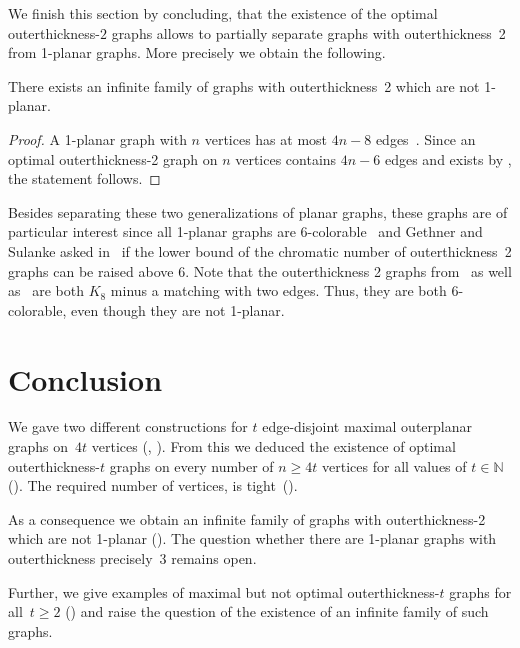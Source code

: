 \documentclass[unicode,runningheads,envcountsame,a4paper,dvipsnames,12pt]{llncs}
\newcommand{\N}{\mathbb{N}}
\begin{document}
	We finish this section by concluding, that the existence of the optimal outerthick\-ness-\(2\) graphs allows to partially separate graphs with outerthickness~2 from 1-planar graphs. More precisely we obtain the following.
	
	\begin{corollary}\label{cor:separating-outerthickness2-1planar}
		There exists an infinite family of graphs with outerthickness~2 which are not 1-planar.
	\end{corollary}
	
	\begin{proof}
		A 1-planar graph with \(n\) vertices has at most \(4n-8\) edges~\cite{edge-num-1-planar}. Since an optimal outerthickness-2 graph on \(n\) vertices contains \(4n-6\) edges and exists by , the statement follows.
	\end{proof}
	
	Besides separating these two generalizations of planar graphs, these graphs are of particular interest since all 1-planar graphs are 6-colorable~\cite{borodin1984solution} and Gethner and Sulanke asked in~\cite{DBLP:journals/gc/GethnerS09} if the lower bound of the chromatic number of outerthickness~2 graphs can be raised above 6. Note that the outerthickness 2 graphs from~ as well as~ are both \(K_8\) minus a matching with two edges. Thus, they are both 6-colorable, even though they are not 1-planar.
	
	\section{Conclusion}
	
	We gave two different constructions for \(t\) edge-disjoint maximal outerplanar graphs on~\(4t\) vertices (, ). From this we deduced the existence of optimal outerthick\-ness-\(t\) graphs on every number of \(n \geq 4t\) vertices for all values of \(t \in \N\) (). The required number of vertices, is tight~().
	
	As a consequence we obtain an infinite family of graphs with outerthick\-\mbox{ness-2} which are not 1-planar (). The question whether there are 1-planar graphs with outerthickness precisely~3 remains open.
	
	Further, we give examples of maximal but not optimal outerthickness-$t$ graphs for all~$t \geq 2$ () and raise the question of the existence of an infinite family of such graphs.
	
\end{document}
